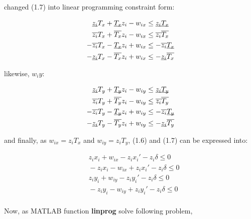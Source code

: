 \documentclass[paper=a4, fontsize=11pt]{scrartcl} %
\numberwithin{equation}{section} %
\numberwithin{figure}{section} %
\numberwithin{table}{section} %
\newcommand{\funcname}[1]{\textbf{#1}}
\begin{document}
changed (1.7) into linear programming constraint form:

\begin{equation}
\begin{split}
\underbar{$z_{i}$} T_{x} + \underbar{$T_{x}$}z_{i} - w_{ix} &\leq \underbar{$z_{i}$}\underbar{$T_{x}$} \\
\overline{z_{i}} T_{x} + \overline{T_{x}}z_{i} - w_{ix} &\leq \overline{z_{i}} \overline{T_{x}} \\
- \overline{z_{i}}T_{x} - \underbar{$T_{x}$}z_{i} + w_{ix} &\leq  -\overline{z_{i}} \underbar{$T_{x}$} \\
- \underbar{$z_{i}$} T_{x} - \overline{T_{x}}z_{i} + w_{ix} &\leq -\underbar{$z_{i}$} \overline{T_{x}}
\end{split}
\end{equation}

likewise, $w_iy$: 

\begin{equation}
\begin{split}
\underbar{$z_{i}$} T_{y} + \underbar{$T_{y}$}z_{i} - w_{iy} &\leq \underbar{$z_{i}$}\underbar{$T_{y}$} \\
\overline{z_{i}} T_{y} + \overline{T_{y}}z_{i} - w_{iy} &\leq \overline{z_{i}} \overline{T_{y}} \\
- \overline{z_{i}}T_{y} - \underbar{$T_{y}$}z_{i} + w_{iy} &\leq  -\overline{z_{i}} \underbar{$T_{y}$} \\
- \underbar{$z_{i}$} T_{y} - \overline{T_{y}}z_{i} + w_{iy} &\leq - \underbar{$z_{i}$} \overline{T_{y}}
\end{split}
\end{equation}

and finally, as $w_{ix} = z_{i}T_{x}$ and $w_{iy} = z_{i}T_{y}$, (1.6) and (1.7) can be expressed into:

\begin{equation}
\begin{split}
\quad z_{i} x_{i} + w_{ix} - z_{i} x_{i}' - z_{i} \delta \leq  0\\
\quad - z_{i} x_{i} - w_{ix} + z_{i} x_{i}' - z_{i} \delta \leq  0\\
\quad z_{i} y_{i} + w_{iy} - z_{i} y_{i}' - z_{i} \delta \leq  0\\
\quad - z_{i} y_{i} - w_{iy} + z_{i} y_{i}' - z_{i} \delta \leq  0\\
\end{split}
\end{equation}

Now, as MATLAB function \funcname{linprog} solve following problem,
\end{document}
